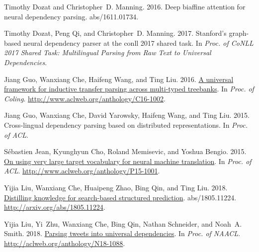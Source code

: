 \documentclass[11pt,a4paper]{article}
\begin{document}
\begin{thebibliography}{}
	Timothy Dozat and Christopher~D. Manning. 2016.
	\newblock Deep biaffine attention for neural dependency parsing.
	 abs/1611.01734.
	
	Timothy Dozat, Peng Qi, and Christopher~D. Manning. 2017.
	\newblock Stanford's graph-based neural dependency parser at the conll 2017
	shared task.
	\newblock In {\em Proc. of CoNLL 2017 Shared Task: Multilingual Parsing from
		Raw Text to Universal Dependencies\/}.
	
	Jiang Guo, Wanxiang Che, Haifeng Wang, and Ting Liu. 2016.
	\newblock \href{http://www.aclweb.org/anthology/C16-1002}{A universal framework
		for inductive transfer parsing across multi-typed treebanks}.
	\newblock In {\em Proc. of Coling\/}.
	\newblock
	\href{http://www.aclweb.org/anthology/C16-1002}{http://www.aclweb.org/anthology/C16-1002}.
	
	Jiang Guo, Wanxiang Che, David Yarowsky, Haifeng Wang, and Ting Liu. 2015.
	\newblock Cross-lingual dependency parsing based on distributed
	representations.
	\newblock In {\em Proc. of ACL\/}.
	
	S\'{e}bastien Jean, Kyunghyun Cho, Roland Memisevic, and Yoshua Bengio. 2015.
	\newblock \href{http://www.aclweb.org/anthology/P15-1001}{On using very large
		target vocabulary for neural machine translation}.
	\newblock In {\em Proc. of ACL\/}.
	\newblock
	\href{http://www.aclweb.org/anthology/P15-1001}{http://www.aclweb.org/anthology/P15-1001}.
	
	Yijia Liu, Wanxiang Che, Huaipeng Zhao, Bing Qin, and Ting Liu.
	2018{}.
	\newblock \href{http://arxiv.org/abs/1805.11224}{Distilling knowledge for
		search-based structured prediction}.
	 abs/1805.11224.
	\newblock
	\href{http://arxiv.org/abs/1805.11224}{http://arxiv.org/abs/1805.11224}.
	
	Yijia Liu, Yi~Zhu, Wanxiang Che, Bing Qin, Nathan Schneider, and Noah~A. Smith.
	2018{}.
	\newblock \href{http://aclweb.org/anthology/N18-1088}{Parsing tweets into
		universal dependencies}.
	\newblock In {\em Proc. of NAACL\/}.
	\newblock
	\href{http://aclweb.org/anthology/N18-1088}{http://aclweb.org/anthology/N18-1088}.
	

\end{thebibliography}
\end{document}
